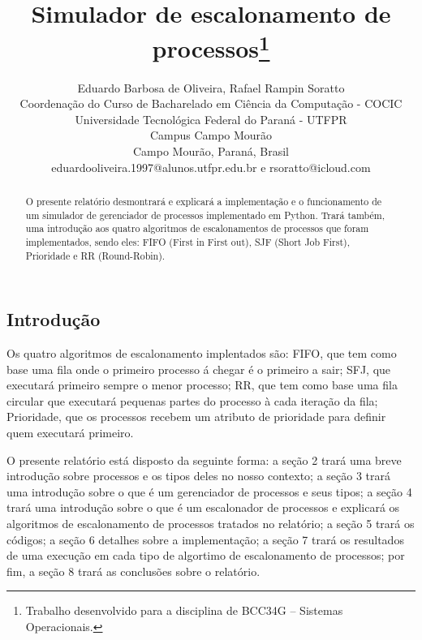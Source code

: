\documentclass[times, 10pt,twocolumn]{article}
\begin{document}
\begin{savenotes}
\title{Simulador de escalonamento de processos\footnote{Trabalho desenvolvido para a disciplina de BCC34G – Sistemas Operacionais.}}


\author{Eduardo Barbosa de Oliveira, Rafael Rampin Soratto\\
Coordenação do Curso de Bacharelado em Ciência da Computação - COCIC\\
Universidade Tecnológica Federal do Paraná - UTFPR\\ 
Campus Campo Mourão\\
Campo Mourão, Paraná, Brasil\\
eduardooliveira.1997@alunos.utfpr.edu.br e rsoratto@icloud.com\\
}

\maketitle
\thispagestyle{empty}

\begin{abstract}
    O presente relatório desmontrará e explicará a implementação e o funcionamento de um simulador de gerenciador de processos implementado em Python. Trará também, uma introdução aos quatro algoritmos de escalonamentos de processos que foram implementados, sendo eles: FIFO (First in First out), SJF (Short Job First), Prioridade e RR (Round-Robin).
\end{abstract}
\section{Introdução} \label{sec_introducao}
    Os quatro algoritmos de escalonamento implentados são: FIFO, que tem como base uma fila onde o primeiro processo á chegar é o primeiro a sair; SFJ, que executará primeiro sempre o menor processo; RR, que tem como base uma fila circular que executará pequenas partes do processo à cada iteração da fila; Prioridade, que os processos recebem um atributo de prioridade para definir quem executará primeiro.
    
    O presente relatório está disposto da seguinte forma: a seção 2 trará uma breve introdução sobre processos e os tipos deles no nosso contexto; a seção 3 trará uma introdução sobre o que é um gerenciador de processos e seus tipos; a seção 4 trará uma introdução sobre o que é um escalonador de processos e explicará os algoritmos de escalonamento de processos tratados no relatório; a seção 5 trará os códigos; a seção 6 detalhes sobre a implementação; a seção 7 trará os resultados de uma execução em cada tipo de algortimo de escalonamento de processos; por fim, a seção 8 trará as conclusões sobre o relatório.
\end{savenotes}
\end{document}
